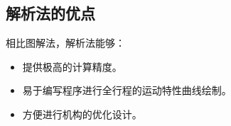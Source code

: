 \subsection{解析法的优点}
相比图解法，解析法能够：
\begin{itemize}
	\item 提供极高的计算精度。
	\item 易于编写程序进行全行程的运动特性曲线绘制。
	\item 方便进行机构的优化设计。
\end{itemize}